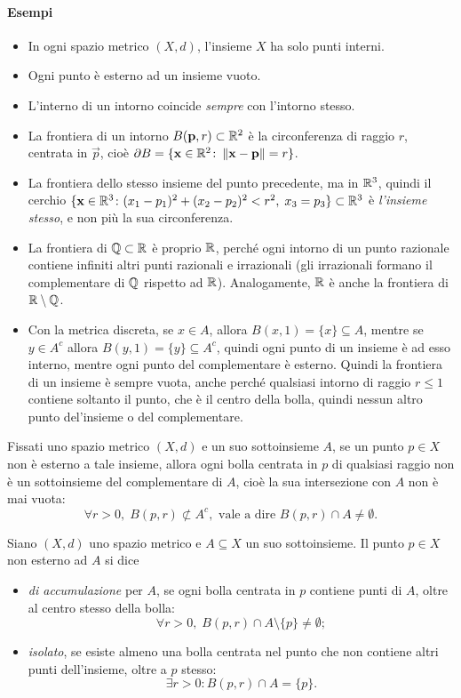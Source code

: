 \paragraph{Esempi}
\begin{itemize}
\item In ogni spazio metrico $(X,d)$, l'insieme $X$ ha solo punti interni.
\item Ogni punto è esterno ad un insieme vuoto.
\item L'interno di un intorno coincide \emph{sempre} con l'intorno stesso.
\item La frontiera di un intorno $B(\mathbf{p},r)\subset\mathbb{R}^2$ è la circonferenza di raggio $r$, centrata in $\vec p$, cioè $\partial B=\{\mathbf{x}\in\mathbb{R}^2\colon\left\|{\mathbf{x}-\mathbf{p}}\right\|=r\}$.
\item La frontiera dello stesso insieme del punto precedente, ma in $\mathbb{R}^3$, quindi il cerchio $\{\mathbf{x}\in\mathbb{R}^3\colon(x_1-p_1)^2+(x_2-p_2)^2<r^2,\;x_3=p_3\}\subset\mathbb{R}^3$ è \emph{l'insieme stesso}, e non più la sua circonferenza.
\item La frontiera di $\mathbb{Q}\subset\mathbb{R}$ è proprio $\mathbb{R}$, perché ogni intorno di un punto razionale contiene infiniti altri punti razionali e irrazionali (gli irrazionali formano il complementare di $\mathbb{Q}$ rispetto ad $\mathbb{R}$). Analogamente, $\mathbb{R}$ è anche la frontiera di $\mathbb{R}\setminus\mathbb{Q}$.
\item Con la metrica discreta, se $x\in A$, allora $B(x,1)=\{x\}\subseteq A$, mentre se $y\in A^c$ allora $B(y,1)=\{y\}\subseteq A^c$, quindi ogni punto di un insieme è ad esso interno, mentre ogni punto del complementare è esterno. Quindi la frontiera di un insieme è sempre vuota, anche perché qualsiasi intorno di raggio $r\leq 1$ contiene soltanto il punto, che è il centro della bolla, quindi nessun altro punto del'insieme o del complementare.
\end{itemize}
\begin{osservazione}
Fissati uno spazio metrico $(X,d)$ e un suo sottoinsieme $A$, se un punto $p\in X$ non è esterno a tale insieme, allora ogni bolla centrata in $p$ di qualsiasi raggio non è un sottoinsieme del complementare di $A$, cioè la sua intersezione con $A$ non è mai vuota:
\[
\forall r>0,\;B(p,r)\not\subset A^c,\text{ vale a dire }B(p,r)\cap A\neq\emptyset.
\]
\end{osservazione}
\begin{definizione}
Siano $(X,d)$ uno spazio metrico e $A\subseteq X$ un suo sottoinsieme. Il punto $p\in X$ non esterno ad $A$ si dice
\begin{itemize}
\item \emph{di accumulazione} per $A$, se ogni bolla centrata in $p$ contiene punti di $A$, oltre al centro stesso della bolla:
\[
\forall r>0,\;B(p,r)\cap A\setminus\{p\}\neq\emptyset;
\]
\item \emph{isolato}, se esiste almeno una bolla centrata nel punto che non contiene altri punti dell'insieme, oltre a $p$ stesso:
\[
\exists r>0\colon B(p,r)\cap A=\{p\}.%
\]
\end{itemize}
\end{definizione}
